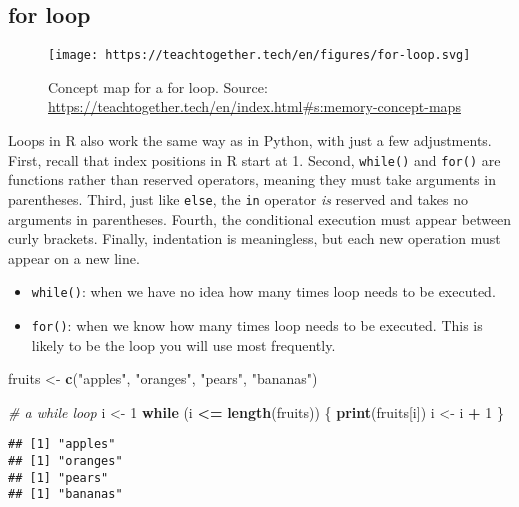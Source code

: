\documentclass[
]{book}
\newenvironment{Shaded}{\begin{snugshade}}{\end{snugshade}}
\newcommand{\CommentTok}[1]{\textcolor[rgb]{0.56,0.35,0.01}{\textit{#1}}}
\newcommand{\ControlFlowTok}[1]{\textcolor[rgb]{0.13,0.29,0.53}{\textbf{#1}}}
\newcommand{\DecValTok}[1]{\textcolor[rgb]{0.00,0.00,0.81}{#1}}
\newcommand{\KeywordTok}[1]{\textcolor[rgb]{0.13,0.29,0.53}{\textbf{#1}}}
\newcommand{\NormalTok}[1]{#1}
\newcommand{\OperatorTok}[1]{\textcolor[rgb]{0.81,0.36,0.00}{\textbf{#1}}}
\newcommand{\StringTok}[1]{\textcolor[rgb]{0.31,0.60,0.02}{#1}}
\providecommand{\tightlist}{%
  \setlength{\itemsep}{0pt}\setlength{\parskip}{0pt}}
\begin{document}
\hypertarget{for-loop}{%
\subsection{for loop}\label{for-loop}}

\begin{figure}
\centering
\texttt{[image: https://teachtogether.tech/en/figures/for-loop.svg]}
\caption{Concept map for a for loop. Source: \url{https://teachtogether.tech/en/index.html\#s:memory-concept-maps}}
\end{figure}

Loops in R also work the same way as in Python, with just a few adjustments. First, recall that index positions in R start at 1. Second, \texttt{while()} and \texttt{for()} are functions rather than reserved operators, meaning they must take arguments in parentheses. Third, just like \texttt{else}, the \texttt{in} operator \emph{is} reserved and takes no arguments in parentheses. Fourth, the conditional execution must appear between curly brackets. Finally, indentation is meaningless, but each new operation must appear on a new line.

\begin{itemize}
\tightlist
\item
  \texttt{while()}: when we have no idea how many times loop needs to be executed.
\item
  \texttt{for()}: when we know how many times loop needs to be executed. This is likely to be the loop you will use most frequently.
\end{itemize}

\begin{Shaded}
\begin{Highlighting}[]
\NormalTok{fruits \textless{}{-}}\StringTok{ }\KeywordTok{c}\NormalTok{(}\StringTok{"apples"}\NormalTok{, }\StringTok{"oranges"}\NormalTok{, }\StringTok{"pears"}\NormalTok{, }\StringTok{"bananas"}\NormalTok{)}

\CommentTok{\# a while loop}
\NormalTok{i \textless{}{-}}\StringTok{ }\DecValTok{1}
\ControlFlowTok{while}\NormalTok{ (i }\OperatorTok{\textless{}=}\StringTok{ }\KeywordTok{length}\NormalTok{(fruits)) \{}
  \KeywordTok{print}\NormalTok{(fruits[i])}
\NormalTok{  i \textless{}{-}}\StringTok{ }\NormalTok{i }\OperatorTok{+}\StringTok{ }\DecValTok{1}
\NormalTok{\}}
\end{Highlighting}
\end{Shaded}

\begin{verbatim}
## [1] "apples"
## [1] "oranges"
## [1] "pears"
## [1] "bananas"
\end{verbatim}
\end{document}
